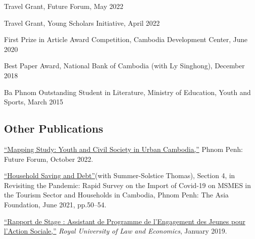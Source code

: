 \documentclass[10pt,a4paper]{article}
\begin{document}
\parindent=0pt
	
	Travel Grant, Future Forum, May 2022 %
	
	Travel Grant, Young Scholars Initiative, April 2022  %
	
	First Prize in Article Award Competition, Cambodia Development Center, June 2020 %
	
	Best Paper Award, National Bank of Cambodia (with Ly Singhong), December 2018 %
	
	Ba Phnom Outstanding Student in Literature, Ministry of Education, Youth and Sports, March 2015




\subsection*{Other Publications}



	\href{}{``Mapping Study: Youth and Civil Society in Urban Cambodia,”} Phnom Penh: Future Forum, October 2022.\\ \vspace{-.5em} 
	
	\href{https://kosalnith.github.io/research/policies/COVID-19-HHSavingsDebt.pdf}{``Household Saving and Debt”}(with Summer-Solstice Thomas), Section 4, in Revisiting the Pandemic: Rapid Survey on the Import of Covid-19 on MSMES in the Tourism Sector and Households in Cambodia, Phnom Penh: The Asia Foundation, June 2021, pp.50--54.\\ \vspace{-.5em} 
			
	\href{https://www.researchgate.net/publication/330936932_Rapport_du_Stage_Assistant_de_Programme_a_l%27YRDP}{``Rapport de Stage : Assistant de Programme de l'Engagement des Jeunes pour l'Action Sociale,”} \textit{Royal University of Law and Economics}, January 2019. \\ \vspace{-.5em}
			
\end{document}
